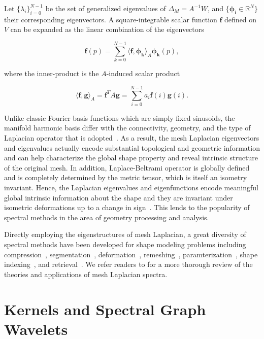 Let $\{\lambda_i\}_{i=0}^{N-1}$ be the set of generalized eigenvalues of
$\Delta_M=A^{-1}W$, and $\{\mathbf{\phi_i}\in\mathbb{R}^N\}$ their corresponding
eigenvectors. A square-integrable scalar function $\mathbf{f}$ defined on $V$ can
be expanded as the linear combination of the eigenvectors

\begin{equation}
\mathbf{f}(p)=\sum_{k=0}^{N-1}\langle \mathbf{f},\mathbf{\phi_k}\rangle_A \mathbf{\phi_k}(p),
\end{equation}

where the inner-product is the $A$-induced scalar product

\begin{equation}
\langle \mathbf{f},\mathbf{g}\rangle_A = \mathbf{f}^T A\mathbf{g}=\sum_{i=0}^{N-1}a_i \mathbf{f}(i)\mathbf{g}(i).
\end{equation}

Unlike classic Fourier basis functions which are simply fixed sinusoids, the
manifold harmonic basis differ with the connectivity, geometry, and the type
of Laplacian operator that is adopted~\cite{Zhang:2010:CGF}. As a result, the
mesh Laplacian eigenvectors and eigenvalues actually encode substantial topological
and geometric information and can help characterize the global shape property and
reveal intrinsic structure of the original mesh. In addition, Laplace-Beltrami
operator is globally defined and is completely determined by the metric tensor,
which is itself an isometry invariant. Hence, the Laplacian eigenvalues and eigenfunctions
encode meaningful global intrinsic information about the shape and they are invariant
under isometric deformations up to a change in sign~\cite{Rustamov:2007:LEF,Sun:2009:CGF}.
This lends to the popularity of spectral methods in the area of geometry processing
and analysis.

Directly employing the eigenstructures of mesh Laplacian, a great diversity of spectral
methods have been developed for shape modeling problems including compression~\cite{Karni2000},
segmentation~\cite{Liu2007}, deformation~\cite{Rong2008}, remeshing~\cite{dong2006spectral},
paramterization~\cite{Zhou2004}, shape indexing~\cite{Reuter:2006:CAD, Rustamov:2007:LEF},
and retrieval~\cite{Lavoue:2012}. We refer readers to \cite{Zhang:2010:CGF} for a more thorough
review of the theories and applications of mesh Laplacian spectra.

\section{Kernels and Spectral Graph Wavelets}

